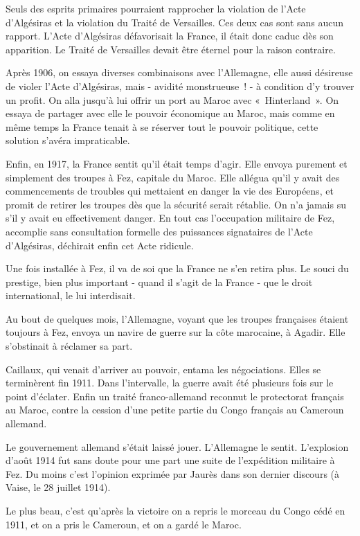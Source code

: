 \documentclass[french,twoside]{book} %
\begin{document}
Seuls des esprits primaires pourraient rapprocher la violation de l'Acte d'Algésiras et la violation du Traité de Versailles. Ces deux cas sont sans aucun rapport. L'Acte d'Algésiras défavorisait la France, il était donc caduc dès son apparition. Le Traité de Versailles devait être éternel pour la raison contraire.\par
Après 1906, on essaya diverses combinaisons avec l'Allemagne, elle aussi désireuse de violer l'Acte d'Algésiras, mais - avidité monstrueuse ! - à condi­tion d'y trouver un profit. On alla jusqu'à lui offrir un port au Maroc avec « Hinterland ». On essaya de partager avec elle le pouvoir économique au Maroc, mais comme en même temps la France tenait à se réserver tout le pouvoir politique, cette solution s'avéra impraticable.\par
Enfin, en 1917, la France sentit qu'il était temps d'agir. Elle envoya purement et simplement des troupes à Fez, capitale du Maroc. Elle allégua qu'il y avait des commencements de troubles qui mettaient en danger la vie des Européens, et promit de retirer les troupes dès que la sécurité serait rétablie. On n'a jamais su s'il y avait eu effectivement danger. En tout cas l'occupation militaire de Fez, accomplie sans consultation formelle des puissances signataires de l'Acte d'Algésiras, déchirait enfin cet Acte ridicule.\par
Une fois installée à Fez, il va de soi que la France ne s'en retira plus. Le souci du prestige, bien plus important - quand il s'agit de la France - que le droit international, le lui interdisait.\par
Au bout de quelques mois, l'Allemagne, voyant que les troupes françaises étaient toujours à Fez, envoya un navire de guerre sur la côte marocaine, à Agadir. Elle s'obstinait à réclamer sa part.\par
Caillaux, qui venait d'arriver au pouvoir, entama les négociations. Elles se terminèrent fin 1911. Dans l'intervalle, la guerre avait été plusieurs fois sur le point d'éclater. Enfin un traité franco-allemand reconnut le protectorat français au Maroc, contre la cession d'une petite partie du Congo français au Cameroun allemand.\par
Le gouvernement allemand s'était laissé jouer. L'Allemagne le sentit. L'explosion d'août 1914 fut sans doute pour une part une suite de l'expédition militaire à Fez. Du moins c'est l'opinion exprimée par Jaurès dans son dernier discours (à Vaise, le 28 juillet 1914).\par
Le plus beau, c'est qu'après la victoire on a repris le morceau du Congo cédé en 1911, et on a pris le Cameroun, et on a gardé le Maroc.\par
\end{document}
